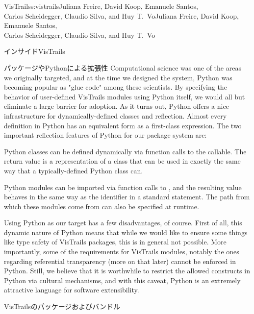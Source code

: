 \begin{aosachaptertoc}{VisTrails}{s:vistrails}{Juliana Freire, David Koop, Emanuele Santos, \\ Carlos Scheidegger, Claudio Silva, and Huy T.\ Vo}{Juliana Freire, David Koop, Emanuele Santos, \\ \hspace*{0.9cm} Carlos Scheidegger, Claudio Silva, and Huy T.\ Vo}
\begin{aosasect1}{インサイドVisTrails}
\begin{aosasect2}{パッケージやPythonによる拡張性}
Computational science was one of the areas we originally targeted, and
at the time we designed the system, Python was becoming popular as
"glue code" among these scientists. By specifying the behavior of
user-defined VisTrails modules using Python itself, we would all but
eliminate a large barrier for adoption.  As it turns out, Python
offers a nice infrastructure for dynamically-defined classes and
reflection. Almost every definition in Python has an equivalent form
as a first-class expression. The two important reflection features of
Python for our package system are:

\begin{aosaitemize}

  \item Python classes can be defined dynamically via function calls to
  the  callable. The return value is a representation of a
  class that can be used in exactly the same way that a
  typically-defined Python class can.

  \item Python modules can be imported via function calls to
  , and the resulting value behaves in the same
  way as the identifier in a standard  statement. The
  path from which these modules come from can also be specified at runtime.

\end{aosaitemize}

Using Python as our target has a few disadvantages, of course. First
of all, this dynamic nature of Python means that while we would like
to ensure some things like type safety of VisTrails packages, this is
in general not possible.  More importantly, some of the requirements
for VisTrails modules, notably the ones regarding referential
transparency (more on that later) cannot be enforced in Python. Still,
we believe that it is worthwhile to restrict the allowed constructs in
Python via cultural mechanisms, and with this caveat, Python is an
extremely attractive language for software extensibility.

\end{aosasect2}

\begin{aosasect2}{VisTrailsのパッケージおよびバンドル}


\end{aosasect2}
\end{aosasect1}
\end{aosachaptertoc}
